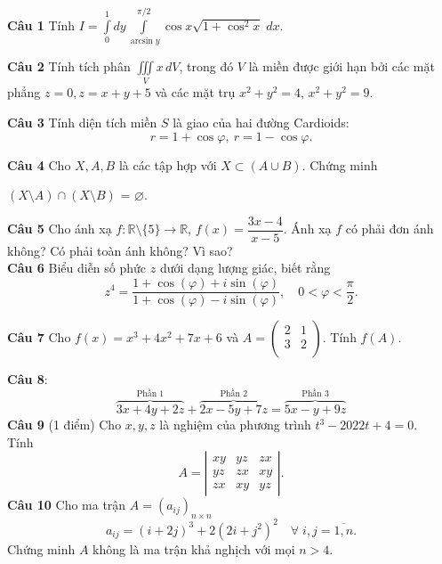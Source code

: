 \documentclass[12pt,a4paper]{article}
\begin{document}
\noindent\textbf{Câu 1} Tính $\displaystyle I = \int\limits_0^1dy\int\limits_{\arcsin{y}}^{\pi/2} \cos{x} \sqrt{1+\cos^2{x}}\;dx.$

   \noindent\textbf{Câu 2} Tính tích phân $\displaystyle\iiint\limits_V x\,dV$, trong đó $V$ là miền được giới hạn bởi các mặt phẳng $z = 0, z = x+y+5$ và các mặt trụ $x^2+y^2 = 4,\, x^2+y^2 = 9.$
   
   \noindent\textbf{Câu 3}  Tính diện tích miền $S$ là giao của 
    hai đường Cardioids: $$r = 1 + \cos{\varphi},\ r = 1 - \cos{\varphi}.$$
    
\noindent\textbf{Câu 4}  Cho $X,A,B$ là các tập hợp với $X \subset (A \cup B) $. Chứng minh
\begin{center}
$(X \setminus A) \cap (X \setminus B)$ = $\varnothing $.
\end{center}

\noindent\textbf{Câu 5}
Cho ánh xạ $f: \mathbb{R}\setminus{\{5\}} \to \mathbb{R}$, $f(x) = \dfrac{3x-4}{x-5}$. Ánh xạ $f$ có phải đơn ánh không? Có phải toàn ánh không? Vì sao?\\


\noindent\textbf{Câu 6}
Biểu diễn số phức $z$ dưới dạng lượng giác, biết rằng
\[
z^4 = \dfrac{1+ \cos(\varphi) + i\sin(\varphi)}{1+\cos(\varphi) - i\sin(\varphi)},\quad 0 < \varphi < \dfrac{\pi}{2}.
\]

\noindent\textbf{Câu 7} Cho $f(x) = x^3 + 4x^2 + 7x + 6 $ và  
$A = \begin{pmatrix}
    2 & 1 \\
    3 & 2 \\
\end{pmatrix}$. Tính $f(A)$.


\noindent\textbf{Câu 8}:
\begin{equation}
\overbrace{3x + 4y + 2z}^{\text{Phần 1}} + \overbrace{2x - 5y + 7z}^{\text{Phần 2}} = \overbrace{5x - y + 9z}^{\text{Phần 3}}
\end{equation}
\noindent\textbf{Câu 9} (1 điểm) Cho $x, y, z$ là nghiệm của phương trình $t^{3}-2022 t+4=0$.\\
Tính
$$
A=\left|\begin{array}{lll}
xy & yz & zx \\
yz & zx & xy \\
zx & xy & yz
\end{array}\right|.
$$
\noindent\textbf{Câu 10} Cho ma trận $A=\left(a_{i j}\right)_{n \times n} $ 
$$  a_{i j}=(i+2j)^{3}+2(2i+j^2)^{2} \quad\forall\; i, j = \overline{1, n}.$$
Chứng minh $A$ không là ma trận khả nghịch với mọi $n>4$.\\
\end{document}
